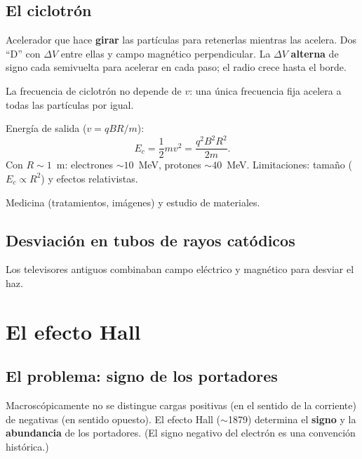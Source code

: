 \documentclass[12pt,a4paper]{article}
\begin{document}
\subsection{El ciclotrón}

Acelerador que hace \textbf{girar} las partículas para retenerlas
mientras las acelera. Dos \enquote{D} con $\Delta V$ entre ellas y campo
magnético perpendicular. La $\Delta V$ \textbf{alterna} de signo cada
semivuelta para acelerar en cada paso; el radio crece hasta el borde.

\begin{keybox}[La clave]
  La frecuencia de ciclotrón no depende de $v$: una única frecuencia fija
  acelera a todas las partículas por igual.
\end{keybox}

Energía de salida ($v = qBR/m$):
\[
\boxed{E_c = \frac{1}{2}m v^2 = \frac{q^2 B^2 R^2}{2m}}.
\]
Con $R\sim 1$~m: electrones $\sim 10$~MeV, protones $\sim 40$~MeV.
Limitaciones: tamaño ($E_c\propto R^2$) y efectos relativistas.

\begin{notebox}
  Medicina (tratamientos, imágenes) y estudio de materiales.
\end{notebox}



\subsection{Desviación en tubos de rayos catódicos}

Los televisores antiguos combinaban campo eléctrico y magnético para
desviar el haz.

\section{El efecto Hall}

\subsection{El problema: signo de los portadores}

Macroscópicamente no se distingue cargas positivas (en el sentido de la
corriente) de negativas (en sentido opuesto). El efecto Hall
($\sim$1879) determina el \textbf{signo} y la \textbf{abundancia} de los
portadores. (El signo negativo del electrón es una convención histórica.)
\end{document}
